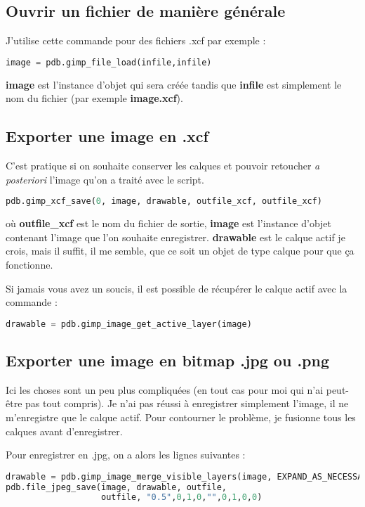 \documentclass[a4paper,twoside]{article}
\begin{document}
\subsection{Ouvrir un fichier de manière générale}
J'utilise cette commande pour des fichiers .xcf par exemple : 
\begin{lstlisting}[language=Python]
image = pdb.gimp_file_load(infile,infile)
\end{lstlisting}
\textbf{image} est l'instance d'objet qui sera créée tandis que \textbf{infile} est simplement le nom du fichier (par exemple \textbf{image.xcf}).

\subsection{Exporter une image en .xcf}
C'est pratique si on souhaite conserver les calques et pouvoir retoucher \textit{a posteriori} l'image qu'on a traité avec le script.

\begin{lstlisting}[language=Python]
pdb.gimp_xcf_save(0, image, drawable, outfile_xcf, outfile_xcf)
\end{lstlisting}
où \textbf{outfile\_xcf} est le nom du fichier de sortie, \textbf{image} est l'instance d'objet contenant l'image que l'on souhaite enregistrer. \textbf{drawable} est le calque actif je crois, mais il suffit, il me semble, que ce soit un objet de type calque pour que ça fonctionne.

\begin{remarque}
Si jamais vous avez un soucis, il est possible de récupérer le calque actif avec la commande :
\begin{lstlisting}[language=Python]
drawable = pdb.gimp_image_get_active_layer(image)
\end{lstlisting}
\end{remarque}

\subsection{Exporter une image en bitmap .jpg ou .png}
Ici les choses sont un peu plus compliquées (en tout cas pour moi qui n'ai peut-être pas tout compris). Je n'ai pas réussi à enregistrer simplement l'image, il ne m'enregistre que le calque actif. Pour contourner le problème, je fusionne tous les calques avant d'enregistrer. 

Pour enregistrer en .jpg, on a alors les lignes suivantes :
\begin{lstlisting}[language=Python]
drawable = pdb.gimp_image_merge_visible_layers(image, EXPAND_AS_NECESSARY)
pdb.file_jpeg_save(image, drawable, outfile, 
                   outfile, "0.5",0,1,0,"",0,1,0,0)
\end{lstlisting}
\end{document}
